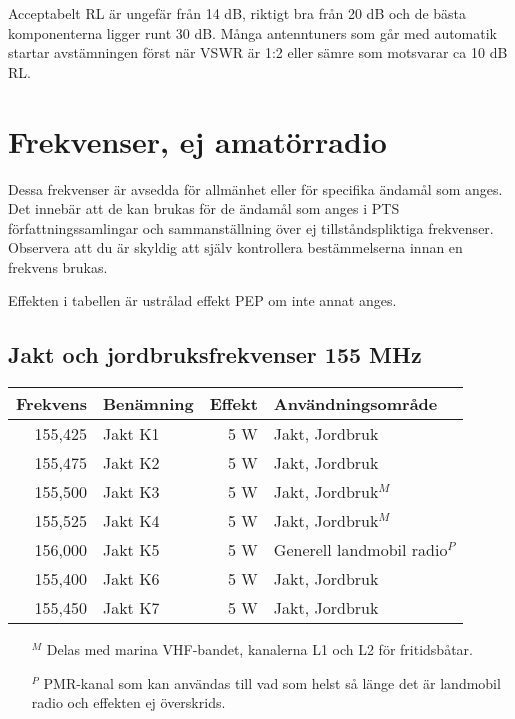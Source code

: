 Acceptabelt RL är ungefär från 14 dB, riktigt bra från 20 dB och de bästa komponenterna ligger runt 30 dB. Många antenntuners som går med automatik startar avstämningen först när VSWR är 1:2 eller sämre som motsvarar ca 10 dB RL.

\section{Frekvenser, ej amatörradio}

Dessa frekvenser är avsedda för allmänhet eller för specifika ända\-mål som anges. Det innebär att de kan brukas för de ändamål som anges i PTS för\-fatt\-nings\-sam\-ling\-ar och sammanställning över ej tillståndspliktiga frekvenser. Observera att du är skyldig att själv kontrollera bestämmelserna innan en frekvens brukas.

Effekten i tabellen är ustrålad effekt PEP om inte annat anges.

\subsection{Jakt och jordbruksfrekvenser 155 MHz}
\begin{longtable}{rlrl}
	\textbf{Frekvens} & \textbf{Benämning} & \textbf{Effekt} & \textbf{Användningsområde}   \\ \hline \endhead
	          155,425 & Jakt K1            &             5 W & Jakt, Jordbruk               \\
	          155,475 & Jakt K2            &             5 W & Jakt, Jordbruk               \\
	          155,500 & Jakt K3            &             5 W & Jakt, Jordbruk$^M$           \\
	          155,525 & Jakt K4            &             5 W & Jakt, Jordbruk$^M$           \\
	          156,000 & Jakt K5            &             5 W & Generell landmobil radio$^P$ \\
	          155,400 & Jakt K6            &             5 W & Jakt, Jordbruk               \\
	          155,450 & Jakt K7            &             5 W & Jakt, Jordbruk
\end{longtable}

\footnotesize
\begin{itemize}
	\item[$^M$] Delas med marina VHF-bandet, kanalerna L1 och L2 för fritidsbåtar.
	\item[$^P$] PMR-kanal som kan användas till vad som helst så länge det är landmobil radio och effekten ej överskrids.
\end{itemize}
\normalsize

